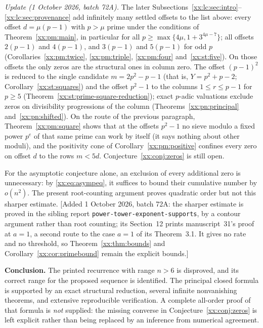\documentclass[11pt,a4paper]{article}
\numberwithin{equation}{section}
\theoremstyle{definition}
\theoremstyle{remark}
\theoremstyle{plain}
\newcommand{\sibPTE}{\texttt{power-\allowbreak{}tower-\allowbreak{}exponent-\allowbreak{}supports}}
\begin{document}
\emph{Update (1 October 2026, batch 72A).}  The later
Subsections~\ref{xx:lc:sec:intro}--\ref{xx:lc:sec:provenance} add infinitely
many settled offsets to the list above: every offset $d=\mu(p-1)$ with
$p>\mu$ prime under the conditions of Theorem~\ref{xx:pm:main}, in particular
for all $p\ge\max\{4\mu,1+3^{4\mu-7}\}$; all offsets $2(p-1)$ and $4(p-1)$, and
$3(p-1)$ and $5(p-1)$ for odd $p$ (Corollaries~\ref{xx:pm:twice},
\ref{xx:pm:triple}, \ref{xx:pm:four} and~\ref{xx:st:five}).  On those offsets
the only zeros are the structural ones in column zero.  The offset $(p-1)^2$ is
reduced to the single candidate $m=2p^2-p-1$ (that is, $Y=p^2+p-2$;
Corollary~\ref{xx:st:squares}) and the offset $p^2-1$ to the columns $1\le
r\le p-1$ for $p\ge5$ (Theorem~\ref{xx:st:prime-square-reduction}); exact
$p$-adic valuations exclude zeros on divisibility progressions of the column
(Theorems~\ref{xx:pn:principal} and~\ref{xx:pn:shifted}).  On the route of the
previous paragraph, Theorem~\ref{xx:pm:square} shows that at the offsets
$p^2-1$ no sieve modulo a fixed power $p^e$ of that same prime can work by
itself (it says nothing about other moduli), and the
positivity cone of Corollary~\ref{xx:pm:positive} confines every zero on
offset $d$ to the rows $m<5d$.  Conjecture~\ref{xx:conj:zeros} is still
open.

For the asymptotic conjecture alone, an exclusion of every additional zero
is unnecessary: by \eqref{xx:eq:asympeq}, it suffices to bound their cumulative
number by $o(n^2)$. The present root-counting argument proves quadratic
order but not this sharper estimate.  [Added 1 October 2026, batch 72A: the sharper estimate is
proved in the sibling report \sibPTE{}, by a contour argument rather
than root counting; its Section~12 prints manuscript~31's proof at $a=1$, a
second route to the case $a=1$ of its Theorem~3.1.  It gives no rate and no
threshold, so Theorem~\ref{xx:thm:bounds} and Corollary~\ref{xx:cor:primebound}
remain the explicit bounds.]

\medskip
\noindent\textbf{Conclusion.}
The printed recurrence with range $n>6$ is disproved, and its correct
range for the proposed sequence is identified. The principal closed formula
is supported by an exact structural reduction, several infinite
nonvanishing theorems, and extensive reproducible verification. A complete
all-order proof of that formula is \emph{not} supplied: the missing converse
in Conjecture~\ref{xx:conj:zeros} is left explicit rather than being replaced
by an inference from numerical agreement.
\end{document}
